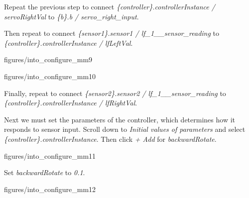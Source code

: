 \documentclass[11pt,a4paper]{../tutorial}
\begin{document}
\begin{instructions}
\item Repeat the previous step to connect  \emph{\{controller\}.controllerInstance / servoRightVal} to \emph{\{b\}.b / servo\_right\_input}.

\item Then repeat to connect \emph{\{sensor1\}.sensor1 / lf\_1\_\_sensor\_reading} to \emph{\{controller\}.controllerInstance / lfLeftVal}.

    \begin{annotation}[width=0.8\linewidth,trim=0 165 0 0,clip]{figures/into_configure_mm9}
    \end{annotation}

    \begin{annotation}[width=0.8\linewidth,trim=0 0 0 126,clip]{figures/into_configure_mm10}
    \end{annotation}

\item Finally, repeat to connect \emph{\{sensor2\}.sensor2 / lf\_1\_\_sensor\_reading} to \emph{\{controller\}.controllerInstance / lfRightVal}.

\item Next we must set the parameters of the controller, which determines how it responds to sensor input. Scroll down to \emph{Initial values of parameters} and select \emph{\{controller\}.controllerInstance}. Then click \emph{+ Add} for \emph{backwardRotate}.

    \begin{annotation}[width=0.8\linewidth]{figures/into_configure_mm11}
    \end{annotation}

\newpage
\item Set \emph{backwardRotate} to \emph{0.1}.

    \begin{annotation}[width=0.8\linewidth,trim=0 0 0 0,clip]{figures/into_configure_mm12}
    \end{annotation}


\end{instructions}
\end{document}
